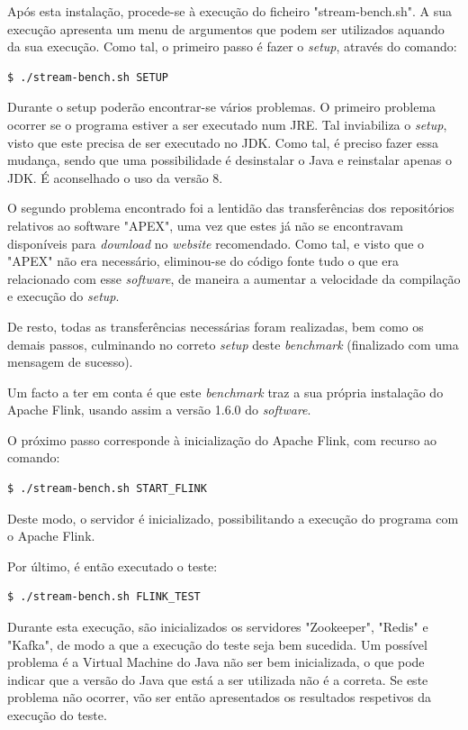 \documentclass[conference]{IEEEtran}
\begin{document}
Após esta instalação, procede-se à execução do ficheiro "stream-bench.sh". A sua execução apresenta um menu de argumentos que podem ser utilizados aquando da sua execução. Como tal, o primeiro passo é fazer o \emph{setup}, através do comando:

\begin{lstlisting}[language=bash]
  $ ./stream-bench.sh SETUP
\end{lstlisting}

Durante o setup poderão encontrar-se vários problemas. O primeiro problema ocorrer se o programa estiver a ser executado num JRE. Tal inviabiliza o \emph{setup}, visto que este precisa de ser executado no JDK. Como tal, é preciso fazer essa mudança, sendo que uma possibilidade é desinstalar o Java e reinstalar apenas o JDK. É aconselhado o uso da versão 8. 

O segundo problema encontrado foi a lentidão das transferências dos repositórios relativos ao software "APEX", uma vez que estes já não se encontravam disponíveis para \emph{download} no \emph{website} recomendado. Como tal, e visto que o "APEX" não era necessário, eliminou-se do código fonte tudo o que era relacionado com esse \emph{software}, de maneira a aumentar a velocidade da compilação e execução do \emph{setup}. 

De resto, todas as transferências necessárias foram realizadas, bem como os demais passos, culminando no correto \emph{setup} deste \emph{benchmark} (finalizado com uma mensagem de sucesso).

Um facto a ter em conta é que este \emph{benchmark} traz a sua própria instalação do Apache Flink, usando assim a versão 1.6.0 do \emph{software}.

O próximo passo corresponde à inicialização do Apache Flink, com recurso ao comando:

\begin{lstlisting}[language=bash]
  $ ./stream-bench.sh START_FLINK
\end{lstlisting}

Deste modo, o servidor é inicializado, possibilitando a execução do programa com o Apache Flink.

Por último, é então executado o teste:

\begin{lstlisting}[language=bash]
  $ ./stream-bench.sh FLINK_TEST
\end{lstlisting}

Durante esta execução, são inicializados os servidores "Zookeeper", "Redis" e "Kafka", de modo a que a execução do teste seja bem sucedida. Um possível problema é a Virtual Machine do Java não ser bem inicializada, o que pode indicar que a versão do Java que está a ser utilizada não é a correta. Se este problema não ocorrer, vão ser então apresentados os resultados respetivos da execução do teste.
\end{document}
